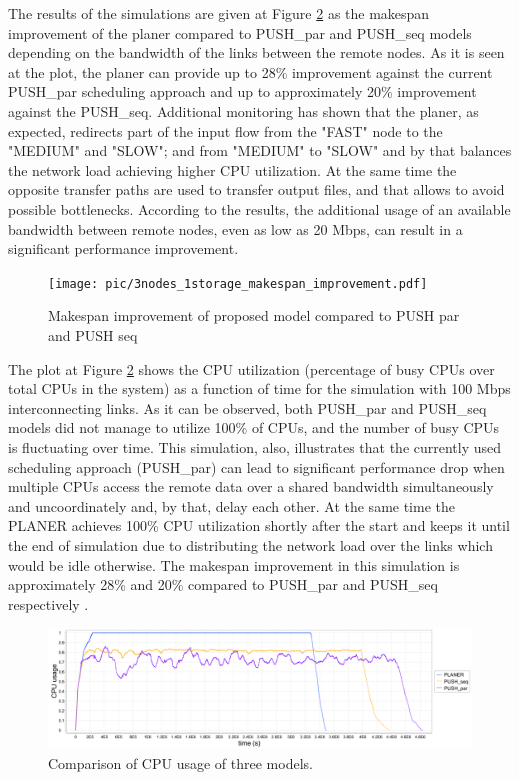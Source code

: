 \documentclass{svjour3}                     %
\begin{document}
The results of the simulations are given at Figure \ref{multi_cpu_consumption} as the makespan improvement of the planer compared to PUSH\_par and PUSH\_seq models depending on the bandwidth of the links between the remote nodes. As it is seen at the plot, the planer can provide up to 28\% improvement against the current PUSH\_par scheduling approach and up to approximately 20\% improvement against the PUSH\_seq. Additional monitoring has shown that the planer, as expected, redirects part of the input flow from the "FAST" node to the "MEDIUM" and "SLOW"; and from "MEDIUM" to "SLOW" and by that balances the network load achieving higher CPU utilization. At the same time the opposite transfer paths are used to transfer output files, and that allows to avoid possible bottlenecks. According to the results, the additional usage of an available bandwidth between remote nodes, even as low as 20 Mbps, can result in a significant performance improvement.
\begin{figure}
  \begin{center}
    \texttt{[image: pic/3nodes\_1storage\_makespan\_improvement.pdf]}
    \caption{Makespan improvement of proposed model compared to PUSH par and PUSH seq}
      \label{multi_makespan_compare}	
  \end{center}  
\end{figure}

The plot at Figure \ref{multi_cpu_consumption} shows the CPU utilization (percentage of busy CPUs over total CPUs in the system) as a function of time for the simulation with 100 Mbps interconnecting links. As it can be observed, both PUSH\_par and PUSH\_seq models did not manage to utilize 100\% of CPUs, and the number of busy CPUs is fluctuating over time. This simulation, also, illustrates that the currently used scheduling approach (PUSH\_par) can lead to significant performance drop when multiple CPUs access the remote data over a shared bandwidth simultaneously and uncoordinately and, by that, delay each other. At the same time the PLANER achieves 100\% CPU utilization shortly after the start and keeps it until the end of simulation due to distributing the network load over the links which would be idle otherwise. The makespan improvement in this simulation is approximately 28\% and 20\% compared to PUSH\_par and PUSH\_seq respectively .
\begin{figure}
  \begin{center}
    \includegraphics [trim= 0mm 00mm 0mm 00mm , clip,width=1\textwidth]{pic/3models_link01.png}
    \caption{Comparison of CPU usage of three models. }
      \label{multi_cpu_consumption}	
  \end{center}  
\end{figure}
\end{document}
